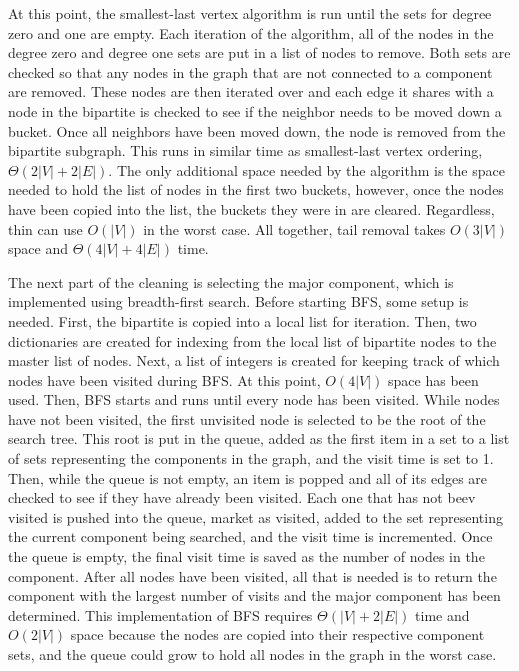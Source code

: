 \documentclass{article}
\begin{document}
        At this point, the smallest-last vertex algorithm is run until the sets for degree zero and one are empty. Each iteration of the algorithm, all of the nodes in the degree zero and degree one sets are put in a list of nodes to remove. Both sets are checked so that any nodes in the graph that are not connected to a component are removed. These nodes are then iterated over and each edge it shares with a node in the bipartite is checked to see if the neighbor needs to be moved down a bucket. Once all neighbors have been moved down, the node is removed from the bipartite subgraph. This runs in similar time as smallest-last vertex ordering, $\Theta(2|V| + 2|E|)$. The only additional space needed by the algorithm is the space needed to hold the list of nodes in the first two buckets, however, once the nodes have been copied into the list, the buckets they were in are cleared. Regardless, thin can use $O(|V|)$ in the worst case. All together, tail removal takes $O(3|V|)$ space and $\Theta(4|V| + 4|E|)$ time.
        \par
        The next part of the cleaning is selecting the major component, which is implemented using breadth-first search. Before starting BFS, some setup is needed. First, the bipartite is copied into a local list for iteration. Then, two dictionaries are created for indexing from the local list of bipartite nodes to the master list of nodes. Next, a list of integers is created for keeping track of which nodes have been visited during BFS. At this point, $O(4|V|)$ space has been used. Then, BFS starts and runs until every node has been visited. While nodes have not been visited, the first unvisited node is selected to be the root of the search tree. This root is put in the queue, added as the first item in a set to a list of sets representing the components in the graph, and the visit time is set to 1. Then, while the queue is not empty, an item is popped and all of its edges are checked to see if they have already been visited. Each one that has not beev visited is pushed into the queue, market as visited, added to the set representing the current component being searched, and the visit time is incremented. Once the queue is empty, the final visit time is saved as the number of nodes in the component. After all nodes have been visited, all that is needed is to return the component with the largest number of visits and the major component has been determined. This implementation of BFS requires $\Theta(|V| + 2|E|)$ time and $O(2|V|)$ space because the nodes are copied into their respective component sets, and the queue could grow to hold all nodes in the graph in the worst case.
\end{document}
